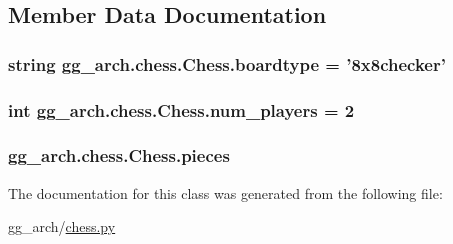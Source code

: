 \subsection{Member Data Documentation}
\hypertarget{classgg__arch_1_1chess_1_1_chess_aa82ec766cebfa6d144948a71f1dcf0d3}{
\subsubsection[{boardtype}]{\setlength{\rightskip}{0pt plus 5cm}string gg\-\_\-arch.\-chess.\-Chess.\-boardtype = '8x8checker'\hspace{0.3cm}{\ttfamily [static]}}}\label{classgg__arch_1_1chess_1_1_chess_aa82ec766cebfa6d144948a71f1dcf0d3}
\hypertarget{classgg__arch_1_1chess_1_1_chess_a8d218ad53b70be5163ddeb252c144c70}{
\subsubsection[{num\-\_\-players}]{\setlength{\rightskip}{0pt plus 5cm}int gg\-\_\-arch.\-chess.\-Chess.\-num\-\_\-players = 2\hspace{0.3cm}{\ttfamily [static]}}}\label{classgg__arch_1_1chess_1_1_chess_a8d218ad53b70be5163ddeb252c144c70}
\hypertarget{classgg__arch_1_1chess_1_1_chess_ad01e5c1a7c3416cab1f5b1b9cc22ea58}{
\subsubsection[{pieces}]{\setlength{\rightskip}{0pt plus 5cm}gg\-\_\-arch.\-chess.\-Chess.\-pieces}}\label{classgg__arch_1_1chess_1_1_chess_ad01e5c1a7c3416cab1f5b1b9cc22ea58}


The documentation for this class was generated from the following file\-:\begin{DoxyCompactItemize}
\item 
gg\-\_\-arch/\hyperlink{chess_8py}{chess.\-py}\end{DoxyCompactItemize}
